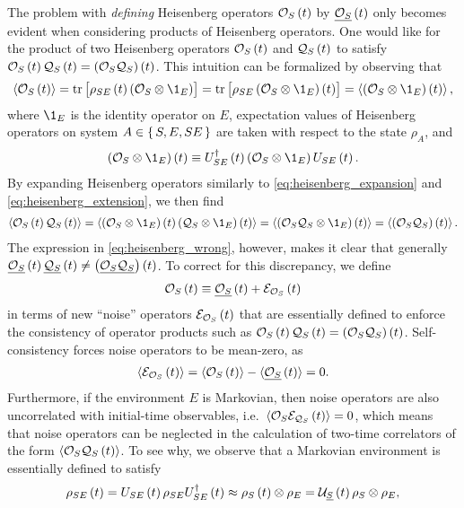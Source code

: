 The problem with {\it defining} Heisenberg operators $\mathcal{O}_S\left( t \right)$ by
$\underline{\mathcal{O}_S}\left( t \right)$ only becomes evident when considering products of
Heisenberg operators.  One would like for the product of two
Heisenberg operators $\mathcal{O}_S\left( t \right)$ and $\mathcal{Q}_S\left( t \right)$ to satisfy
$\mathcal{O}_S\left( t \right)\mathcal{Q}_S\left( t \right)=\left( \mathcal{O}_S\mathcal{Q}_S \right)\left( t \right)$.  This intuition can be
formalized by observing that
\begin{align}
  \bk{\O_S\p{t}}
  = \tr\sp{\rho_{SE}\p{t} \p{\O_S\otimes\1_E}}
  = \tr\sp{\rho_{SE} \p{\O_S\otimes\1_E}\p{t}}
  = \bk{\p{\O_S\otimes\1_E}\p{t}},
  \label{eq:heisenberg_expansion}
\end{align}
where $\1_E$ is the identity operator on $E$, expectation values of
Heisenberg operators on system $A\in\set{S,E,SE}$ are taken with
respect to the state $\rho_A$, and
\begin{align}
  \p{\O_S\otimes\1_E}\p{t}
  \equiv U_{SE}^\dag\p{t} \p{\O_S\otimes\1_E} U_{SE}\p{t}.
  \label{eq:heisenberg_extension}
\end{align}
By expanding Heisenberg operators similarly to
\eqref{eq:heisenberg_expansion} and \eqref{eq:heisenberg_extension},
we then find
\begin{align}
  \bk{\O_S\p{t}\Q_S\p{t}}
  = \bk{\p{\O_S\otimes\1_E}\p{t} \p{\Q_S\otimes\1_E}\p{t}}
  = \bk{\p{\O_S\Q_S\otimes\1_E}\p{t}}
  = \bk{\p{\O_S\Q_S}\p{t}}.
\end{align}
The expression in \eqref{eq:heisenberg_wrong}, however, makes it clear
that generally
$\underline{\mathcal{O}_S}\left( t \right) \underline{\mathcal{Q}_S}\left( t \right)\ne\left( \underline{\mathcal{O}_S\mathcal{Q}_S} \right)\left( t \right)$.  To correct
for this discrepancy, we define
\begin{align}
  \mathcal{O}_S\left( t \right) \equiv \underline{\mathcal{O}_S}\left( t \right) + \mathcal{E}_{\mathcal{O}_S}\left( t \right)
  \label{eq:noise_def}
\end{align}
in terms of new ``noise'' operators $\mathcal{E}_{\mathcal{O}_S}\left( t \right)$ that are
essentially defined to enforce the consistency of operator products
such as $\mathcal{O}_S\left( t \right)\mathcal{Q}_S\left( t \right)=\left( \mathcal{O}_S\mathcal{Q}_S \right)\left( t \right)$. Self-consistency
forces noise operators to be mean-zero, as
\begin{align}
  \braket{\mathcal{E}_{\mathcal{O}_S}\left( t \right)} = \braket{\mathcal{O}_S\left( t \right)} - \braket{\underline{\mathcal{O}_S}\left( t \right)} = 0.
\end{align}
Furthermore, if the environment $E$ is Markovian, then noise operators
are also uncorrelated with initial-time observables,
i.e.~$\braket{\mathcal{O}_S\mathcal{E}_{\mathcal{Q}_S}\left( t \right)}=0$, which means that noise operators can
be neglected in the calculation of two-time correlators of the form
$\braket{\mathcal{O}_S\mathcal{Q}_S\left( t \right)}$.  To see why, we observe that a Markovian
environment is essentially defined to satisfy
\begin{align}
  \rho_{SE}\left( t \right) = U_{SE}\left( t \right) \rho_{SE} U_{SE}^\dag\left( t \right)
  \approx \rho_S\left( t \right)\otimes\rho_E
  = \mathcal{U}_{\underline S}\left( t \right) \rho_S\otimes\rho_E,
  \label{eq:markov}
\end{align}
